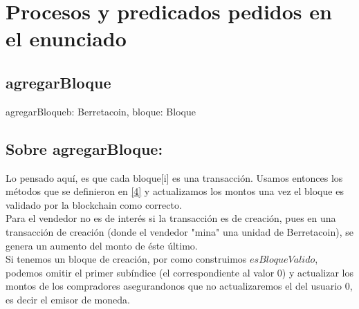 \documentclass[10pt,a4paper]{article}
\begin{document}
\section{Procesos y predicados pedidos en el enunciado}

\subsection{agregarBloque}

\begin{proc}{agregarBloque}{\Inout b: Berretacoin, \In bloque: Bloque}{}
    
    
   
\end{proc}
\subsection{Sobre agregarBloque: }
Lo pensado aquí, es que cada bloque[i] es una transacción. Usamos  entonces los métodos que se definieron en \ref{4} y actualizamos los montos una vez el bloque es validado por la blockchain como correcto.\\


Para el vendedor no es de interés si la transacción es de creación, pues en una transacción de creación (donde el vendedor "mina" una unidad de Berretacoin), se genera un aumento del monto de éste último.\\

Si tenemos un bloque de creación, por como construimos $esBloqueValido$, podemos omitir el primer subíndice (el correspondiente al valor $0$) y actualizar los montos de los compradores asegurandonos que no actualizaremos el del usuario $0$, es decir el emisor de moneda.\\
\end{document}
